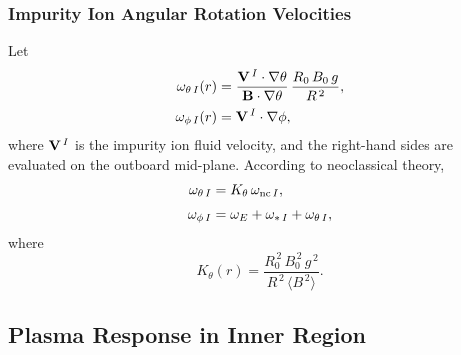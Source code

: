 \documentclass[12pt,prb,aps]{revtex4-1}
\begin{document}
\subsubsection{Impurity Ion Angular Rotation Velocities}\label{srotation}
Let
\begin{align}
\omega_{\theta\,I}(r)&=\frac{{\bf V}^{\,I}\cdot\nabla\theta}{{\bf B}\cdot\nabla\theta}\,\frac{R_0\,B_0\,g}{R^{\,2}},\\[0.5ex]
\omega_{\phi\,I}(r) &= {\bf V}^{\,I}\cdot\nabla\phi,
\end{align}
where ${\bf V}^{\,I}$ is the impurity ion fluid velocity, and the right-hand sides are evaluated on the outboard mid-plane. According to neoclassical theory,
\begin{align}
\omega_{\theta\,I} &= K_\theta\,\omega_{{\rm nc}\,I},\\[0.5ex]
\omega_{\phi\,I} &= \omega_E+\omega_{\ast\,I} + \omega_{\theta\,I},
\end{align}
where
\begin{equation}
K_\theta(r) = \frac{R_0^{\,2}\,B_0^{\,2}\,g^{\,2}}{R^{\,2}\,\langle B^{\,2}\rangle}.
\end{equation}

\subsection{Plasma Response in Inner Region}
\end{document}
